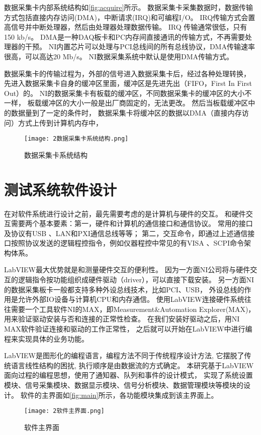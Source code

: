 数据采集卡内部系统结构如\autoref{fig:acquire}所示。
数据采集卡采集数据时，数据传输方式包括直接内存访问(DMA)，中断请求(IRQ)和可编程I/O。
IRQ传输方式会置高信号并中断处理器，然后由处理器处理数据传输。
IRQ 传输通常很低，只有150 kb/s。
DMA是一种DAQ板卡和PC内存间直接通讯的传输方式，不再需要处理器的干预。
NI内置芯片可以处理与PCI总线间的所有总线协议，DMA传输速率很高，可以高达20 Mb/s。
NI数据采集系统中默认是使用DMA传输方式。

数据采集卡的传输过程为，外部的信号进入数据采集卡后，经过各种处理转换，
先进入数据采集卡自身的缓冲区里面，缓冲区是先进先出（FIFO，First In First Out）的。
NI的数据采集卡有板载的缓冲区，不同数据采集卡的缓冲区的大小不一样，
板载缓冲区的大小一般是出厂商固定的，无法更改。
然后当板载缓冲区中的数据量到了一定的条件时，
数据采集卡将缓冲区的数据以DMA（直接内存访问）方式上传到计算机内存中，

\begin{figure}[htbp]
    \centering
    \texttt{[image: 2数据采集卡系统结构.png]}
    \caption{\label{fig:acquire}数据采集卡系统结构}
\end{figure}

\section{测试系统软件设计}
在对软件系统进行设计之前，最先需要考虑的是计算机与硬件的交互。
和硬件交互需要两个基本要素：第一，硬件和计算机的通信接口和通信协议。
常用的接口及协议有USB 、LAN和PXI通信总线等等；
第二，交互命令，即通过上述通信接口按照协议发送的逻辑程控指令，例如仪器程控中常见的有VISA 、SCPI命令架构体系。

LabVIEW最大优势就是和测量硬件交互的便利性。
因为一方面NI公司将与硬件交互的逻辑指令按功能组织成硬件驱动（driver），可以直接下载安装。
另一方面NI的数据采集板卡一般都支持多种外设总线技术，比如PCI、USB，
外设总线的作用是允许外部IO设备与计算机CPU和内存通信。
使用LabVIEW连接硬件系统往往需要一个工具软件NI的MAX，即Measurement\&Automation Explorer(MAX)，
用来验证驱动安装与否和连接的正常性检查。
在我们安装好驱动之后，用NI MAX软件验证连接和驱动的工作正常性，
之后就可以开始在LabVIEW中进行编程来实现具体的业务功能。

LabVIEW是图形化的编程语言，编程方法不同于传统程序设计方法, 它摆脱了传统语言线性结构的困扰, 
执行顺序是由数据流的方式确定。
本研究基于LabVIEW面向过程的编程思想，使用了通知器、队列和事件的设计模式，
实现了系统设置模块、信号采集模块、数据显示模块、信号分析模块、数据管理模块等模块的设计。
软件的主界面如\autoref{fig:main}所示，各功能模块集成到该主界面上。
\begin{figure}[htbp]
    \centering
    \texttt{[image: 2软件主界面.png]}
    \caption{\label{fig:main}软件主界面}
\end{figure}

